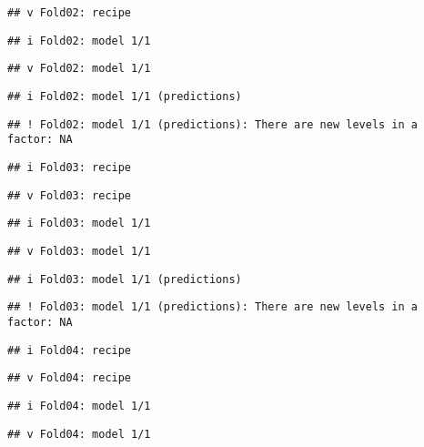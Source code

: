 \documentclass[
]{article}
\begin{document}
\begin{verbatim}
## v Fold02: recipe
\end{verbatim}

\begin{verbatim}
## i Fold02: model 1/1
\end{verbatim}

\begin{verbatim}
## v Fold02: model 1/1
\end{verbatim}

\begin{verbatim}
## i Fold02: model 1/1 (predictions)
\end{verbatim}

\begin{verbatim}
## ! Fold02: model 1/1 (predictions): There are new levels in a factor: NA
\end{verbatim}

\begin{verbatim}
## i Fold03: recipe
\end{verbatim}

\begin{verbatim}
## v Fold03: recipe
\end{verbatim}

\begin{verbatim}
## i Fold03: model 1/1
\end{verbatim}

\begin{verbatim}
## v Fold03: model 1/1
\end{verbatim}

\begin{verbatim}
## i Fold03: model 1/1 (predictions)
\end{verbatim}

\begin{verbatim}
## ! Fold03: model 1/1 (predictions): There are new levels in a factor: NA
\end{verbatim}

\begin{verbatim}
## i Fold04: recipe
\end{verbatim}

\begin{verbatim}
## v Fold04: recipe
\end{verbatim}

\begin{verbatim}
## i Fold04: model 1/1
\end{verbatim}

\begin{verbatim}
## v Fold04: model 1/1
\end{verbatim}
\end{document}
